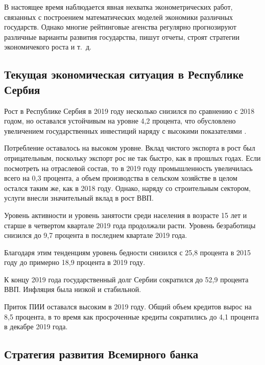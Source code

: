 
В настоящее время наблюдается явная нехватка эконометрических работ, связанных с построением математических моделей экономики различных государств.
Однако многие рейтинговые агенства регулярно прогнозируют различные варианты развития государства, пишут отчеты, строят стратегии экономичекого роста и т.~д.

\subsection{Текущая экономическая ситуация в Республике Сербия}

Рост в Республике Сербия в 2019 году несколько снизился по сравнению с 2018 годом, но оставался устойчивым на уровне 4,2 процента, что обусловлено увеличением государственных инвестиций наряду с высокими показателями .

Потребление оставалось на высоком уровне.
Вклад чистого экспорта в рост был отрицательным, поскольку экспорт рос не так быстро, как в прошлых годах.
Если посмотреть на отраслевой состав, то в 2019 году промышленность увеличилась всего на 0,3 процента, а объем производства в сельском хозяйстве в целом остался таким же, как в 2018 году.
Однако, наряду со строительным сектором, услуги внесли значительный вклад в рост ВВП.

Уровень активности и уровень занятости среди населения в возрасте 15 лет и старше в четвертом квартале 2019 года продолжали расти.
Уровень безработицы снизился до 9,7 процента в последнем квартале 2019 года.

Благодаря этим тенденциям уровень бедности снизился с 25,8 процента в 2015 году до примерно 18,9 процента в 2019 году.

К концу 2019 года государственный долг Сербии сократился до 52,9 процента ВВП.
Инфляция была низкой и стабильной.

Приток ПИИ оставался высоким в 2019 году.
Общий объем кредитов вырос на 8,5 процента, в то время как просроченные кредиты сократились до 4,1 процента в декабре 2019 года.

\subsection{Стратегия развития Всемирного банка}

